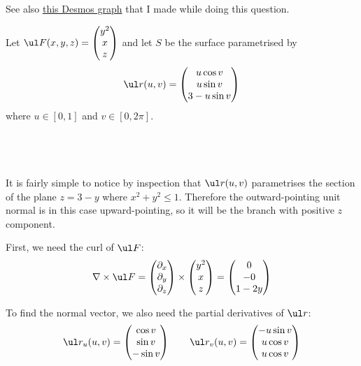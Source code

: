 \documentclass[a4paper]{article}
\begin{document}
See also \href{https://www.desmos.com/calculator/lt9gbsamu1}{this Desmos graph} that I made while doing this question.



Let $\ul F(x, y, z) = \begin{pmatrix} y^2 \\ x \\ z \end{pmatrix}$ and let $S$ be the surface parametrised by $$\ul r(u,v) = \begin{pmatrix} u \cos v \\ u \sin v \\ 3 - u \sin v \end{pmatrix}$$
where $u \in [0,1]$ and $v \in [0, 2\pi]$.

\subsection{~}

It is fairly simple to notice by inspection that $\ul r(u, v)$ parametrises the section of the plane $z = 3-y$ where $x^2 + y^2 \le 1$. Therefore the outward-pointing unit normal is in this case upward-pointing, so it will be the branch with positive $z$ component.

First, we need the curl of $\ul F$: $$\nabla \times \ul F = \begin{pmatrix} \partial_x \\ \partial_y \\ \partial_z \end{pmatrix} \times \begin{pmatrix} y^2 \\ x \\ z \end{pmatrix} = \begin{pmatrix} 0 \\ -0 \\ 1 - 2y \end{pmatrix}$$

To find the normal vector, we also need the partial derivatives of $\ul r$: $$\ul r_u(u, v) = \begin{pmatrix} \cos v \\ \sin v \\ - \sin v \end{pmatrix} \qquad \ul r_v(u, v) = \begin{pmatrix} -u \sin v \\ u \cos v \\ u \cos v \end{pmatrix}$$
\end{document}
